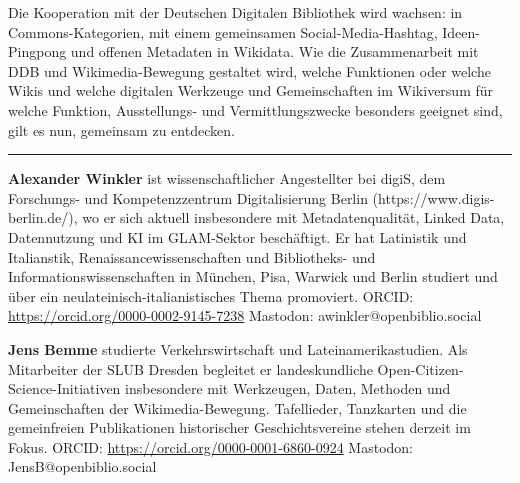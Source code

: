\documentclass[a4paper,
fontsize=11pt,
oneside,
numbers=noperiodatend,
parskip=half-,
bibliography=totoc,
final
]{scrartcl}
\begin{document}
Die Kooperation mit der Deutschen Digitalen Bibliothek wird wachsen: in
Commons-Kategorien, mit einem gemeinsamen Social-Media-Hashtag,
Ideen-Pingpong und offenen Metadaten in Wikidata. Wie die Zusammenarbeit
mit DDB und Wikimedia-Bewegung gestaltet wird, welche Funktionen oder
welche Wikis und welche digitalen Werkzeuge und Gemeinschaften im
Wikiversum für welche Funktion, Ausstellungs- und Vermittlungszwecke
besonders geeignet sind, gilt es nun, gemeinsam zu entdecken.

\begin{center}\rule{0.5\linewidth}{0.5pt}\end{center}

\textbf{Alexander Winkler} ist wissenschaftlicher Angestellter bei
digiS, dem Forschungs- und Kompetenzzentrum Digitalisierung Berlin
(https://www.digis-berlin.de/), wo er sich aktuell insbesondere mit
Metadatenqualität, Linked Data, Datennutzung und KI im GLAM-Sektor
beschäftigt. Er hat Latinistik und Italianstik,
Renaissancewissenschaften und Bibliotheks- und
Informationswissenschaften in München, Pisa, Warwick und Berlin studiert
und über ein neulateinisch-italianistisches Thema promoviert. ORCID:
\url{https://orcid.org/0000-0002-9145-7238} \textbar{} Mastodon:
awinkler@openbiblio.social

\textbf{Jens Bemme} studierte Verkehrswirtschaft und
Lateinamerikastudien. Als Mitarbeiter der SLUB Dresden begleitet er
landeskundliche Open-Citizen-Science-Initiativen insbesondere mit
Werkzeugen, Daten, Methoden und Gemeinschaften der Wikimedia-Bewegung.
Tafellieder, Tanzkarten und die gemeinfreien Publikationen historischer
Geschichtsvereine stehen derzeit im Fokus. ORCID:
\url{https://orcid.org/0000-0001-6860-0924} \textbar{} Mastodon:
JensB@openbiblio.social
\end{document}
